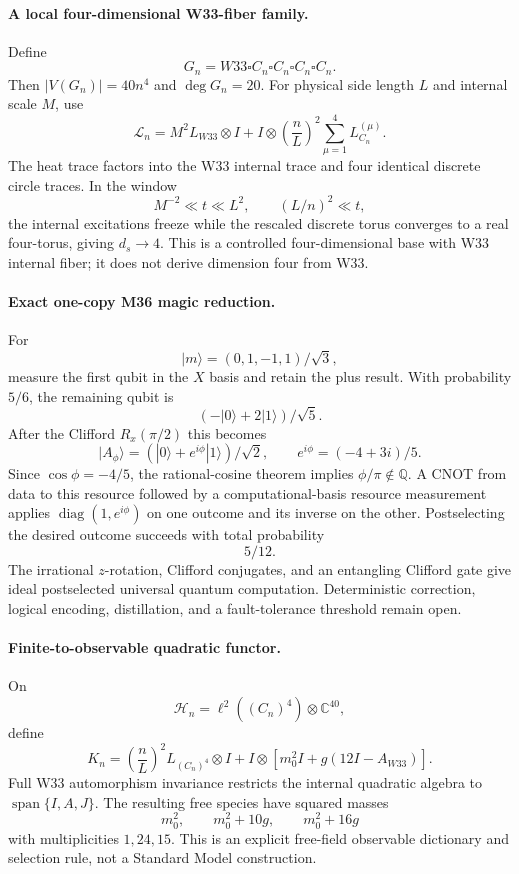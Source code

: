 \paragraph{A local four-dimensional W33-fiber family.}
Define
\[
G_n=W33\square C_n\square C_n\square C_n\square C_n.
\]
Then $|V(G_n)|=40n^4$ and $\deg G_n=20$.  For physical side length $L$ and
internal scale $M$, use
\[
\mathcal L_n=M^2L_{W33}\otimes I+
I\otimes\left(\frac nL\right)^2
\sum_{\mu=1}^4L_{C_n}^{(\mu)}.
\]
The heat trace factors into the W33 internal trace and four identical discrete
circle traces.  In the window
\[
M^{-2}\ll t\ll L^2,\qquad(L/n)^2\ll t,
\]
the internal excitations freeze while the rescaled discrete torus converges to
a real four-torus, giving $d_s\to4$.  This is a controlled four-dimensional
base with W33 internal fiber; it does not derive dimension four from W33.

\paragraph{Exact one-copy M36 magic reduction.}
For
\[
|m\rangle=(0,1,-1,1)/\sqrt3,
\]
measure the first qubit in the $X$ basis and retain the plus result.  With
probability $5/6$, the remaining qubit is
\[
(-|0\rangle+2|1\rangle)/\sqrt5.
\]
After the Clifford $R_x(\pi/2)$ this becomes
\[
|A_\phi\rangle=(|0\rangle+e^{i\phi}|1\rangle)/\sqrt2,
\qquad e^{i\phi}=(-4+3i)/5.
\]
Since $\cos\phi=-4/5$, the rational-cosine theorem implies
$\phi/\pi\notin\mathbb Q$.  A CNOT from data to this resource followed by a
computational-basis resource measurement applies
$\operatorname{diag}(1,e^{i\phi})$ on one outcome and its inverse on the
other.  Postselecting the desired outcome succeeds with total probability
\[
\boxed{5/12}.
\]
The irrational $z$-rotation, Clifford conjugates, and an entangling Clifford
gate give ideal postselected universal quantum computation.  Deterministic
correction, logical encoding, distillation, and a fault-tolerance threshold
remain open.

\paragraph{Finite-to-observable quadratic functor.}
On
\[
\mathcal H_n=\ell^2((C_n)^4)\otimes\mathbb C^{40},
\]
define
\[
K_n=\left(\frac nL\right)^2L_{(C_n)^4}\otimes I+
I\otimes[m_0^2I+g(12I-A_{W33})].
\]
Full W33 automorphism invariance restricts the internal quadratic algebra to
$\operatorname{span}\{I,A,J\}$.  The resulting free species have squared
masses
\[
m_0^2,\qquad m_0^2+10g,\qquad m_0^2+16g
\]
with multiplicities $1,24,15$.  This is an explicit free-field observable
dictionary and selection rule, not a Standard Model construction.

